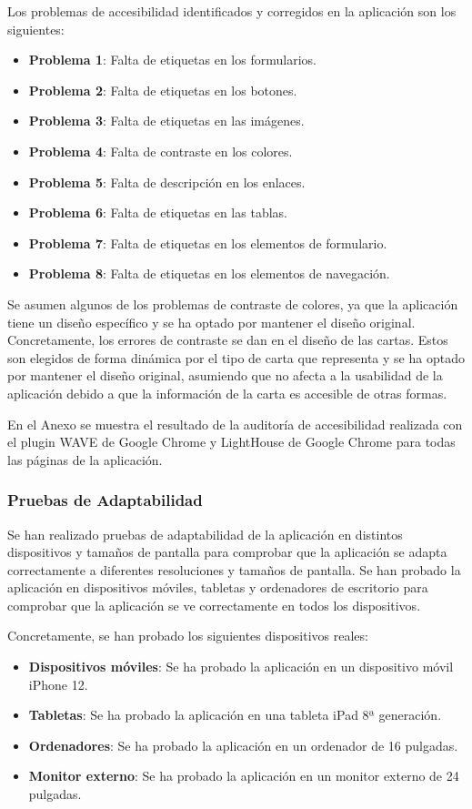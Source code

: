 Los problemas de accesibilidad identificados y corregidos en la aplicación son los siguientes:
\begin{itemize}
    \item \textbf{Problema 1}: Falta de etiquetas en los formularios.
    \item \textbf{Problema 2}: Falta de etiquetas en los botones.
    \item \textbf{Problema 3}: Falta de etiquetas en las imágenes.
    \item \textbf{Problema 4}: Falta de contraste en los colores.
    \item \textbf{Problema 5}: Falta de descripción en los enlaces.
    \item \textbf{Problema 6}: Falta de etiquetas en las tablas.
    \item \textbf{Problema 7}: Falta de etiquetas en los elementos de formulario.
    \item \textbf{Problema 8}: Falta de etiquetas en los elementos de navegación.
\end{itemize}

Se asumen algunos de los problemas de contraste de colores, ya que la aplicación tiene un diseño específico y se ha optado por mantener el diseño original.
Concretamente, los errores de contraste se dan en el diseño de las cartas. Estos son elegidos de forma dinámica por el tipo de carta que representa y se ha optado por mantener el diseño original,
asumiendo que no afecta a la usabilidad de la aplicación debido a que la información de la carta es accesible de otras formas.

En el Anexo se muestra el resultado de la auditoría de accesibilidad realizada con el plugin WAVE de Google Chrome y LightHouse de Google Chrome para todas las páginas de la aplicación.




\subsubsection{Pruebas de Adaptabilidad}
Se han realizado pruebas de adaptabilidad de la aplicación en distintos dispositivos y tamaños de pantalla para comprobar que la aplicación se adapta correctamente a diferentes resoluciones y tamaños de pantalla.
Se han probado la aplicación en dispositivos móviles, tabletas y ordenadores de escritorio para comprobar que la aplicación se ve correctamente en todos los dispositivos.

Concretamente, se han probado los siguientes dispositivos reales:
\begin{itemize}
    \item \textbf{Dispositivos móviles}: Se ha probado la aplicación en un dispositivo móvil iPhone 12.
    \item \textbf{Tabletas}: Se ha probado la aplicación en una tableta iPad 8ª generación.
    \item \textbf{Ordenadores}: Se ha probado la aplicación en un ordenador de 16 pulgadas.
    \item \textbf{Monitor externo}: Se ha probado la aplicación en un monitor externo de 24 pulgadas.
\end{itemize}

